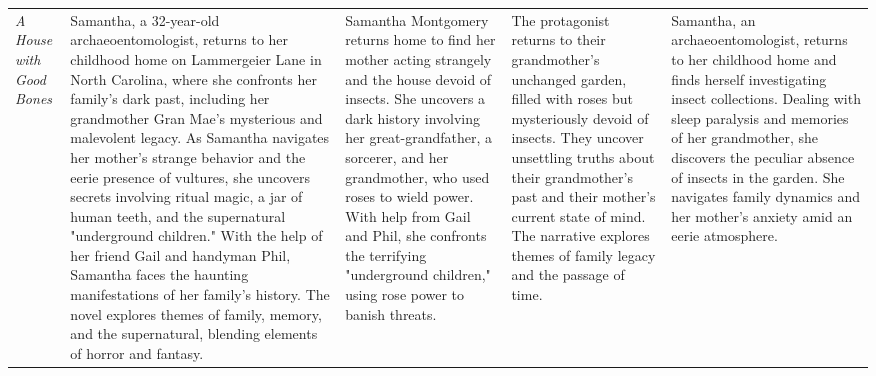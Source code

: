 \begin{longtable}{|p{1cm}|p{3cm}|p{3cm}|p{3cm}|p{3cm}|}
        \textit{A House with Good Bones} & {\color{character}Samantha}, a 32-year-old archaeoentomologist, returns to her childhood home on {\color{location}Lammergeier Lane} in {\color{location}North Carolina}, where she confronts her family's dark past, including her grandmother {\color{character}Gran Mae's} mysterious and malevolent legacy. As Samantha navigates her mother's strange behavior and the {\color{event}eerie presence of vultures}, she uncovers secrets involving {\color{event}ritual magic}, a jar of human teeth, and the supernatural "underground children." With the help of her friend {\color{character}Gail} and handyman {\color{character}Phil}, Samantha faces the haunting manifestations of her family's history. The novel explores themes of {\color{theme}family, memory, and the supernatural}, blending elements of horror and fantasy. & {\color{character}Samantha Montgomery} returns home to find her mother acting strangely and the house devoid of insects. She uncovers a dark history involving her {\color{character}great-grandfather}, a sorcerer, and her grandmother, who used {\color{event}roses to wield power}. With help from {\color{character}Gail} and {\color{character}Phil}, she confronts the terrifying "{\color{event}underground children}," using rose power to banish threats. & The protagonist returns to their {\color{character}grandmother's} unchanged garden, filled with roses but {\color{event}mysteriously devoid of insects}. They uncover {\color{theme}unsettling truths about their grandmother's past} and their mother's current state of mind. The narrative explores themes of {\color{theme}family legacy and the passage of time}. & {\color{character}Samantha}, an archaeoentomologist, returns to her childhood home and finds herself investigating {\color{event}insect collections}. Dealing with {\color{theme}sleep paralysis} and memories of her grandmother, she discovers the {\color{event}peculiar absence of insects} in the garden. She navigates family dynamics and her mother's anxiety amid an eerie atmosphere. \\

    
\end{longtable}
